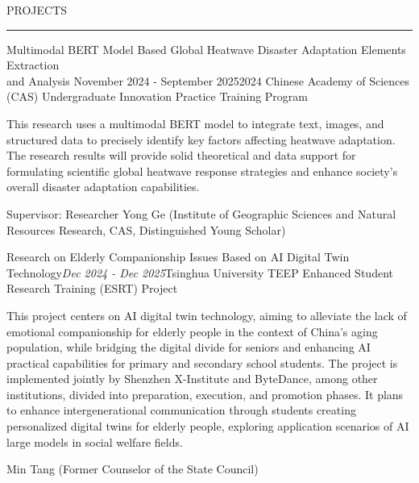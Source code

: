 \documentclass{resume} %
\renewenvironment{rSection}[1]{
\sectionskip
\textcolor{TsinghuaPurple}{\MakeUppercase{#1}}
\sectionlineskip
\hrule
\begin{list}{}{
\setlength{\leftmargin}{0em}
}
\item[]
}{
\end{list}
}
\begin{document}
\begin{rSection}{PROJECTS}

\begin{rSubsection}{Multimodal BERT Model Based Global Heatwave Disaster Adaptation Elements Extraction \\and Analysis} {November 2024 - September 2025}{2024 Chinese Academy of Sciences (CAS) Undergraduate Innovation Practice Training Program}{}

\item This research uses a multimodal BERT model to integrate text, images, and structured data to precisely identify key factors affecting heatwave adaptation. The research results will provide solid theoretical and data support for formulating scientific global heatwave response strategies and enhance society's overall disaster adaptation capabilities.
\item Supervisor: Researcher Yong Ge (Institute of Geographic Sciences and Natural Resources Research, CAS, Distinguished Young Scholar)    
 
\end{rSubsection}  


\begin{rSubsection}{Research on Elderly Companionship Issues Based on AI Digital Twin Technology}{\textit{Dec 2024 - Dec 2025}}{Tsinghua University TEEP Enhanced Student Research Training (ESRT) Project}{} 
\item This project centers on AI digital twin technology, aiming to alleviate the lack of emotional companionship for elderly people in the context of China's aging population, while bridging the digital divide for seniors and enhancing AI practical capabilities for primary and secondary school students. The project is implemented jointly by Shenzhen X-Institute and ByteDance, among other institutions, divided into preparation, execution, and promotion phases. It plans to enhance intergenerational communication through students creating personalized digital twins for elderly people, exploring application scenarios of AI large models in social welfare fields.            
\item Min Tang (Former Counselor of the State Council)   
\end{rSubsection}

\end{rSection}

\end{document}
